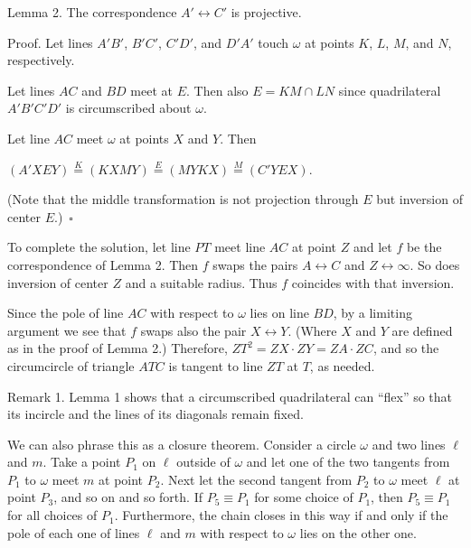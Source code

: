 \documentclass{article}
\begin{document}
Lemma 2. The correspondence \(\displaystyle A' \leftrightarrow C'\) is projective.

Proof. Let lines \(\displaystyle A'B'\), \(\displaystyle B'C'\), \(\displaystyle C'D'\), and \(\displaystyle D'A'\) touch \(\displaystyle \omega\) at points \(\displaystyle K\), \(\displaystyle L\), \(\displaystyle M\), and \(\displaystyle N\), respectively.

Let lines \(\displaystyle AC\) and \(\displaystyle BD\) meet at \(\displaystyle E\). Then also \(\displaystyle E = KM \cap LN\) since quadrilateral \(\displaystyle A'B'C'D'\) is circumscribed about \(\displaystyle \omega\).

Let line \(\displaystyle AC\) meet \(\displaystyle \omega\) at points \(\displaystyle X\) and \(\displaystyle Y\). Then

\(\displaystyle (A'XEY) \stackrel{K}{=} (KXMY) \stackrel{E}{=} (MYKX) \stackrel{M}{=} (C'YEX).\)

(Note that the middle transformation is not projection through \(\displaystyle E\) but inversion of center \(\displaystyle E\).) \(\displaystyle \square\)

To complete the solution, let line \(\displaystyle PT\) meet line \(\displaystyle AC\) at point \(\displaystyle Z\) and let \(\displaystyle f\) be the correspondence of Lemma 2. Then \(\displaystyle f\) swaps the pairs \(\displaystyle A \leftrightarrow C\) and \(\displaystyle Z \leftrightarrow \infty\). So does inversion of center \(\displaystyle Z\) and a suitable radius. Thus \(\displaystyle f\) coincides with that inversion.

Since the pole of line \(\displaystyle AC\) with respect to \(\displaystyle \omega\) lies on line \(\displaystyle BD\), by a limiting argument we see that \(\displaystyle f\) swaps also the pair \(\displaystyle X \leftrightarrow Y\). (Where \(\displaystyle X\) and \(\displaystyle Y\) are defined as in the proof of Lemma 2.) Therefore, \(\displaystyle ZT^2 = ZX \cdot ZY = ZA \cdot ZC\), and so the circumcircle of triangle \(\displaystyle ATC\) is tangent to line \(\displaystyle ZT\) at \(\displaystyle T\), as needed.

Remark 1. Lemma 1 shows that a circumscribed quadrilateral can ``flex'' so that its incircle and the lines of its diagonals remain fixed.

We can also phrase this as a closure theorem. Consider a circle \(\displaystyle \omega\) and two lines \(\displaystyle \ell\) and \(\displaystyle m\). Take a point \(\displaystyle P_1\) on \(\displaystyle \ell\) outside of \(\displaystyle \omega\) and let one of the two tangents from \(\displaystyle P_1\) to \(\displaystyle \omega\) meet \(\displaystyle m\) at point \(\displaystyle P_2\). Next let the second tangent from \(\displaystyle P_2\) to \(\displaystyle \omega\) meet \(\displaystyle \ell\) at point \(\displaystyle P_3\), and so on and so forth. If \(\displaystyle P_5 \equiv P_1\) for some choice of \(\displaystyle P_1\), then \(\displaystyle P_5 \equiv P_1\) for all choices of \(\displaystyle P_1\). Furthermore, the chain closes in this way if and only if the pole of each one of lines \(\displaystyle \ell\) and \(\displaystyle m\) with respect to \(\displaystyle \omega\) lies on the other one.
\end{document}
